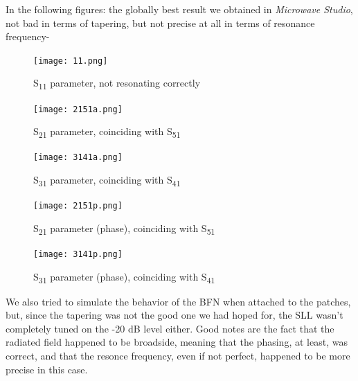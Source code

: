 \par\medskip
\noindent

In the following figures: the globally best result we obtained in \textit{Microwave Studio}, not bad in terms of tapering, but not precise at all in terms of resonance frequency-

\begin{figure}[H]
\centering
\texttt{[image: 11.png]}
\caption{S\textsubscript{11} parameter, not resonating correctly}
\label{a}
\end{figure}

\begin{figure}[H]
\centering
\texttt{[image: 2151a.png]}
\caption{S\textsubscript{21} parameter, coinciding with S\textsubscript{51}}
\label{a}
\end{figure}

\begin{figure}[H]
\centering
\texttt{[image: 3141a.png]}
\caption{S\textsubscript{31} parameter, coinciding with S\textsubscript{41}}
\label{b}
\end{figure}

\begin{figure}[H]
\centering
\texttt{[image: 2151p.png]}
\caption{S\textsubscript{21} parameter (phase), coinciding with S\textsubscript{51}}
\label{c}
\end{figure}

\begin{figure}[H]
\centering
\texttt{[image: 3141p.png]}
\caption{S\textsubscript{31} parameter (phase), coinciding with S\textsubscript{41}}
\label{d}
\end{figure}

\par\medskip
\noindent
We also tried to simulate the behavior of the BFN when attached to the patches, but, since the tapering was not the good one we had hoped for, the SLL wasn't completely tuned on the -20 dB level either. Good notes are the fact that the radiated field happened to be broadside, meaning that the phasing, at least, was correct, and that the resonce frequency, even if not perfect, happened to be more precise in this case.